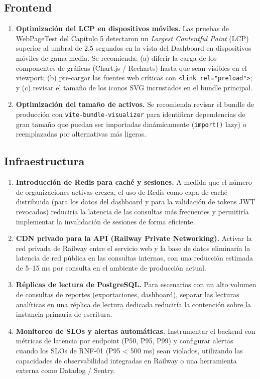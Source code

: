 \subsection{Frontend}\label{frontend}

\begin{enumerate}
\def\labelenumi{\arabic{enumi}.}
\item
  \textbf{Optimización del LCP en dispositivos móviles.} Las pruebas de WebPageTest del Capítulo 5 detectaron un \emph{Largest Contentful Paint} (LCP) superior al umbral de 2.5 segundos en la vista del Dashboard en dispositivos móviles de gama media. Se recomienda: (a) diferir la carga de los componentes de gráficas (Chart.js / Recharts) hasta que sean visibles en el viewport; (b) pre-cargar las fuentes web críticas con \texttt{\textless{}link\ rel="preload"\textgreater{}}; y (c) revisar el tamaño de los iconos SVG incrustados en el bundle principal.
\item
  \textbf{Optimización del tamaño de activos.} Se recomienda revisar el bundle de producción con \texttt{vite-bundle-visualizer} para identificar dependencias de gran tamaño que puedan ser importadas dinámicamente (\texttt{import()} lazy) o reemplazadas por alternativas más ligeras.
\end{enumerate}

\subsection{Infraestructura}\label{infraestructura}

\begin{enumerate}
\def\labelenumi{\arabic{enumi}.}
\item
  \textbf{Introducción de Redis para caché y sesiones.} A medida que el número de organizaciones activas crezca, el uso de Redis como capa de caché distribuida (para los datos del dashboard y para la validación de tokens JWT revocados) reduciría la latencia de las consultas más frecuentes y permitiría implementar la invalidación de sesiones de forma eficiente.
\item
  \textbf{CDN privado para la API (Railway Private Networking).} Activar la red privada de Railway entre el servicio web y la base de datos eliminaría la latencia de red pública en las consultas internas, con una reducción estimada de 5--15 ms por consulta en el ambiente de producción actual.
\item
  \textbf{Réplicas de lectura de PostgreSQL.} Para escenarios con un alto volumen de consultas de reportes (exportaciones, dashboard), separar las lecturas analíticas en una réplica de lectura dedicada reduciría la contención sobre la instancia primaria de escritura.
\item
  \textbf{Monitoreo de SLOs y alertas automáticas.} Instrumentar el backend con métricas de latencia por endpoint (P50, P95, P99) y configurar alertas cuando los SLOs de RNF-01 (P95 \textless{} 500 ms) sean violados, utilizando las capacidades de observabilidad integradas en Railway o una herramienta externa como Datadog / Sentry.
\end{enumerate}

